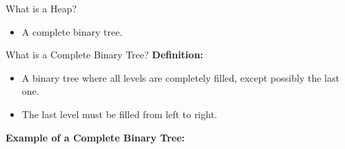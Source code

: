 \begin{frame}{What is a Heap?}
    \begin{itemize}
        \item A complete binary tree.
    \end{itemize}

\end{frame}


\begin{frame}{What is a Complete Binary Tree?}
\textbf{Definition:}
\begin{itemize}
    \item A binary tree where all levels are completely filled, except possibly the last one.
    \item The last level must be filled from left to right.
\end{itemize}
\textbf{Example of a Complete Binary Tree:}

\begin{center}

\end{center}
\end{frame}

